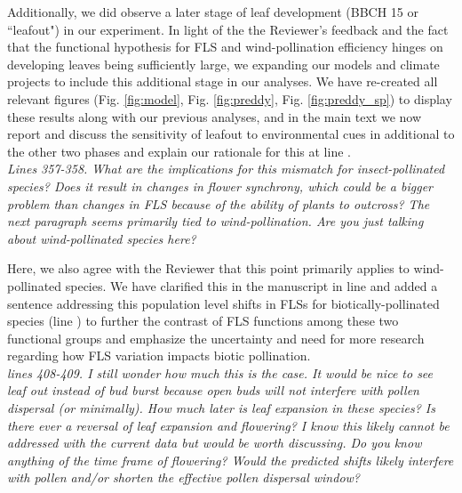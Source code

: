 \documentclass[11pt]{article}
\begin{document}
\noindent Additionally, we did observe a later stage of leaf development (BBCH 15 or ``leafout") in our experiment. In light of the the Reviewer's feedback and the fact that the functional hypothesis for FLS and wind-pollination efficiency hinges on developing leaves being sufficiently large, we expanding our models and climate projects to include this additional stage in our analyses. We have re-created all relevant figures (Fig. \ref{fig:model}, Fig. \ref{fig:preddy}, Fig. \ref{fig:preddy_sp}) to display these results along with our previous analyses, and in the main text we now report and discuss the sensitivity of leafout to environmental cues in additional to the other two phases and explain our rationale for this at line .\\ 

\emph{Lines  357-358. What are the implications for this mismatch for insect-pollinated species? Does it result in changes in flower synchrony, which could be a bigger problem than changes in FLS because of the ability of plants to outcross? The next paragraph seems primarily tied to wind-pollination. Are you just talking about wind-pollinated species here?}
 
\noindent Here, we also agree with the Reviewer that this point primarily applies to wind-pollinated species. We have clarified this in the manuscript in line  and added a sentence addressing this population level shifts in FLSs for biotically-pollinated species (line ) to further the contrast of FLS functions among these two functional groups and emphasize the uncertainty and need for more research regarding how FLS variation impacts biotic pollination. \\
 
\emph{lines 408-409. I still wonder how much this is the case. It would be nice to see leaf out instead of bud burst because open buds will not interfere with pollen dispersal (or minimally). How much later is leaf expansion in these species? Is there ever a reversal of leaf expansion and flowering? I know this likely cannot be addressed with the current data but would be worth discussing. Do you know anything of the time frame of flowering? Would the predicted shifts likely interfere with pollen and/or shorten the effective pollen dispersal window?}\\
\end{document}
